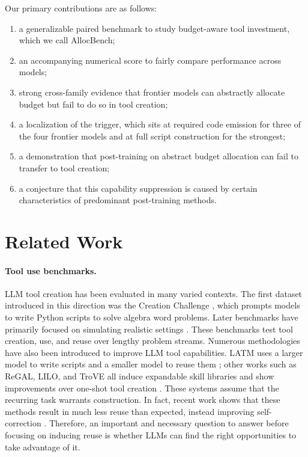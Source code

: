 \documentclass{article}
\begin{document}
Our primary contributions are as follows:
\begin{enumerate}
    \item a generalizable paired benchmark to study budget-aware tool investment, which we call AllocBench;
    \item an accompanying numerical score to fairly compare performance across models;
    \item strong cross-family evidence that frontier models can abstractly allocate budget but fail to do so in tool creation;
    \item a localization of the trigger, which sits at required code emission for three of the four frontier models and at full script construction for the strongest;
    \item a demonstration that post-training on abstract budget allocation can fail to transfer to tool creation;
    \item a conjecture that this capability suppression is caused by certain characteristics of predominant post-training methods.
\end{enumerate}

\section{Related Work}

\paragraph{Tool use benchmarks.} LLM tool creation has been evaluated in many varied contexts. The first dataset introduced in this direction was the Creation Challenge \citep{qian2023creator}, which prompts models to write Python scripts to solve algebra word problems. Later benchmarks have primarily focused on simulating realistic settings \citep{huang2024ultratool, yu2026wildtoolbench}. These benchmarks test tool creation, use, and reuse over lengthy problem streams. Numerous methodologies have also been introduced to improve LLM tool capabilities. LATM uses a larger model to write scripts and a smaller model to reuse them
\citep{cai2024latm}; other works such as ReGAL, LILO, and TroVE all induce expandable skill libraries and show improvements over one-shot tool creation \citep{stengeleskin2024regal,grand2024lilo,wang2024trove}. These systems assume that the recurring task warrants construction. In fact, recent work shows that these methods result in much less reuse than expected, instead improving self-correction
\citep{berlotattwell2024librarylearning}. Therefore, an important and necessary question to answer before focusing on inducing reuse is whether LLMs can find the right opportunities to take advantage of it.
\end{document}
